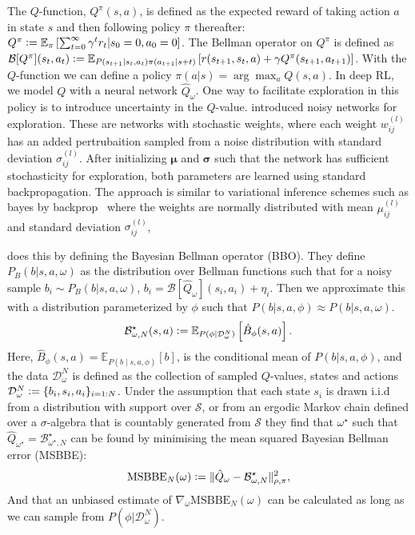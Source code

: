 \documentclass[]{uai2021} %
\newcommand{\defeq}{\vcentcolon=}
\newcommand{\E}{\mathbb{E}}
\newcommand{\D}{\mathcal{D}}
\newcommand{\B}{\mathcal{B}}
\newcommand{\state}{\mathcal{S}}
\begin{document}
The \(Q\)-function, \(Q^\pi(s,a)\), is defined as the expected reward of taking action
\(a\) in state \(s\) and then following policy \(\pi\) thereafter:
\(Q^\pi \defeq \E_\pi \left[ \sum_{t=0}^\infty \gamma^t r_t \vert s_0=0, a_0=0 \right]\).
The Bellman operator on \(Q^\pi\) is defined as
\(\B[Q^\pi](s_t,a_t) \defeq \E_{P(s_{t+1} \vert s_t, a_t)\pi(a_{t+1} \vert s+t)}
\left[ r(s_{t+1}, s_t, a) + \gamma Q^\pi(s_{t+1}, a_{t+1}) \right]\). With the
\(Q\)-function we can define a policy \(\pi(a \vert s) = \arg\max_a Q(s,a)\).
In deep RL, we model \(Q\) with a neural network \(\hat{Q}_\omega\).
One way to facilitate exploration in this policy is to introduce uncertainty in the
\(Q\)-value.
\citet{fortunato_noisy_2019} introduced noisy networks for exploration.
These are networks with stochastic weights, where each weight \(w^{(l)}_{ij}\)
has an added pertrubaition sampled from a noise distribution with standard deviation \(\sigma^{(l)}_{ij}\).
After initializing \(\bm{\mu}\) and \(\bm{\sigma}\) such that the network has sufficient
stochasticity for exploration, both parameters are learned using standard backpropagation.
The approach is similar to variational inference schemes such as bayes by backprop~\cite{blundell_weight_2015} where the weights are normally distributed with mean 
\(\mu^{(l)}_{ij}\) and standard deviation \(\sigma^{(l)}_{ij}\),


\cite{fellows_bayesian_2021} does this by defining the Bayesian Bellman
operator (BBO). They define \(P_B(b \vert s, a, \omega)\) as the distribution over
Bellman functions such that for a noisy sample \(b_i \sim P_B(b \vert s,a,\omega)\),
\(b_i = \B[\hat{Q}_\omega](s_i, a_i) + \eta_i\). Then we approximate this with a
distribution parameterized by \(\phi\) such that
\(P(b \vert s,a,\phi) \approx P(b \vert s,a,\omega)\).
\begin{equation}
    \B_{\omega, N}^\star(s,a) \defeq \E_{P(\phi \vert \D_\omega^N)} \left[ \hat{B}_\phi(s,a) \right].
\end{equation}
Here, \(\hat{B}_\phi(s,a) = \E_{P(b \mid s, a, \phi)}[b]\), is the conditional mean of
\(P(b \vert s, a, \phi)\), and the data \(\D_\omega^N\) is defined as the collection of
sampled \(Q\)-values, states and actions \(\D_\omega^N \defeq \{b_i, s_i, a_i\}_{i=1:N}\).
Under the assumption that each state \(s_i\) is drawn i.i.d from a distribution with
support over \(\state\), or from an ergodic Markov chain defined over a \(\sigma\)-algebra that is
countably generated from \(\state\) they find that \(\omega^\star\) such that
\(\hat{Q}_{\omega^\star} = \B^\star_{\omega^\star, N}\) can be found 
by minimising the mean squared Bayesian Bellman error (MSBBE):
\begin{equation}
    \mathrm{MSBBE}_N(\omega) \defeq \lVert \hat{Q}_{\omega} - \B^\star_{\omega, N} \lVert^2_{\rho, \pi},
\end{equation}
And that an unbiased estimate of \(\nabla_\omega \mathrm{MSBBE}_N(\omega)\) can be calculated
as long as we can sample from \(P(\phi \vert \D_\omega^N)\).
\end{document}
